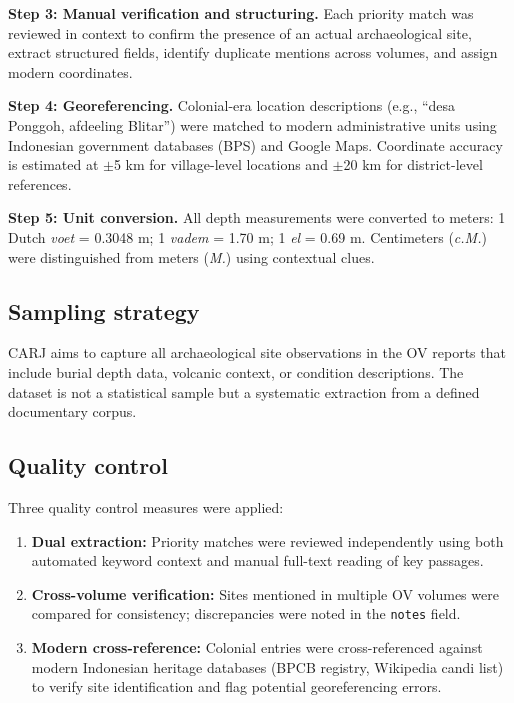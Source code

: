 \documentclass[11pt]{article}
\begin{document}
\textbf{Step 3: Manual verification and structuring.} Each priority match was reviewed in context to confirm the presence of an actual archaeological site, extract structured fields, identify duplicate mentions across volumes, and assign modern coordinates.

\textbf{Step 4: Georeferencing.} Colonial-era location descriptions (e.g., ``desa Ponggoh, afdeeling Blitar'') were matched to modern administrative units using Indonesian government databases (BPS) and Google Maps. Coordinate accuracy is estimated at $\pm$5 km for village-level locations and $\pm$20 km for district-level references.

\textbf{Step 5: Unit conversion.} All depth measurements were converted to meters: 1 Dutch \textit{voet} = 0.3048 m; 1 \textit{vadem} = 1.70 m; 1 \textit{el} = 0.69 m. Centimeters (\textit{c.M.}) were distinguished from meters (\textit{M.}) using contextual clues.

\subsection{Sampling strategy}

CARJ aims to capture all archaeological site observations in the OV reports that include burial depth data, volcanic context, or condition descriptions. The dataset is not a statistical sample but a systematic extraction from a defined documentary corpus.

\subsection{Quality control}

Three quality control measures were applied:
\begin{enumerate}
    \item \textbf{Dual extraction:} Priority matches were reviewed independently using both automated keyword context and manual full-text reading of key passages.
    \item \textbf{Cross-volume verification:} Sites mentioned in multiple OV volumes were compared for consistency; discrepancies were noted in the \texttt{notes} field.
    \item \textbf{Modern cross-reference:} Colonial entries were cross-referenced against modern Indonesian heritage databases (BPCB registry, Wikipedia candi list) to verify site identification and flag potential georeferencing errors.
\end{enumerate}
\end{document}
